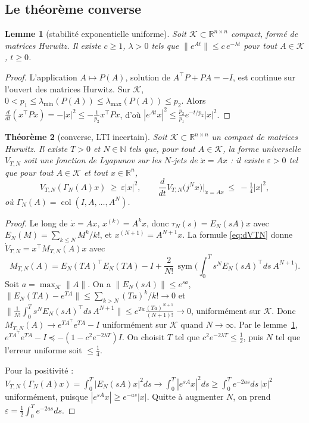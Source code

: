 \documentclass[11pt,a4paper]{article}
\newtheorem{theorem}{Théorème}[section]
\newtheorem{lemma}[theorem]{Lemme}
\theoremstyle{definition}
\theoremstyle{remark}
\newcommand{\R}{\mathbb{R}}
\newcommand{\N}{\mathbb{N}}
\newcommand{\jet}[2]{j^{#1}#2}
\newcommand{\tr}{^{\top}}
\newcommand{\sym}{\operatorname{sym}}
\newcommand{\col}{\operatorname{col}}
\begin{document}
\subsection{Le théorème converse}
\begin{lemma}[stabilité exponentielle uniforme]\label{lem:unif}
Soit $\mathcal K\subset\R^{n\times n}$ compact, formé de matrices Hurwitz. Il existe $c\ge1$, $\lambda>0$ tels que $\|e^{At}\|\le c\,e^{-\lambda t}$ pour tout $A\in\mathcal K$, $t\ge 0$.
\end{lemma}
\begin{proof}
L'application $A\mapsto P(A)$, solution de $A\tr P + PA = -I$, est continue sur l'ouvert des matrices Hurwitz. Sur $\mathcal K$, $0<p_1\le \lambda_{\min}(P(A))\le\lambda_{\max}(P(A))\le p_2$. Alors $\frac{d}{dt}(x\tr P x) = -|x|^2\le -\frac{1}{p_2}x\tr Px$, d'où $|e^{At}x|^2\le \frac{p_2}{p_1}e^{-t/p_2}|x|^2$.
\end{proof}

\begin{theorem}[converse, LTI incertain]\label{thm:LTI}
Soit $\mathcal K\subset\R^{n\times n}$ un compact de matrices Hurwitz. Il existe $T>0$ et $N\in\N$ tels que, pour tout $A\in\mathcal K$, la forme universelle $V_{T,N}$ soit une fonction de Lyapunov sur les $N$-jets de $\dot x = Ax$ : il existe $\varepsilon>0$ tel que pour tout $A\in\mathcal K$ et tout $x\in\R^n$,
\[
V_{T,N}(\Gamma_N(A)x)\ \ge\ \varepsilon|x|^2,\qquad
\frac{d}{dt}V_{T,N}\big(\jet{N}{x}\big)\Big|_{\dot x = Ax}\ \le\ -\tfrac14|x|^2,
\]
où $\Gamma_N(A) = \col(I,A,\dots,A^N)$.
\end{theorem}
\begin{proof}
Le long de $\dot x = Ax$, $x^{(k)} = A^kx$, donc $\tau_N(s) = E_N(sA)x$ avec $E_N(M) = \sum_{k\le N}M^k/k!$, et $x^{(N+1)} = A^{N+1}x$. La formule \eqref{eq:dVTN} donne $\dot V_{T,N} = x\tr M_{T,N}(A)x$ avec
\[
M_{T,N}(A) = E_N(TA)\tr E_N(TA) - I + \frac{2}{N!}\,\sym\Big(\int_0^T s^N E_N(sA)\tr ds\ A^{N+1}\Big).
\]
Soit $a = \max_{\mathcal K}\|A\|$. On a $\|E_N(sA)\|\le e^{sa}$, $\|E_N(TA) - e^{TA}\|\le \sum_{k>N}(Ta)^k/k!\to 0$ et $\big\|\frac{1}{N!}\int_0^Ts^NE_N(sA)\tr ds\,A^{N+1}\big\|\le e^{Ta}\frac{(Ta)^{N+1}}{(N+1)!}\to0$, uniformément sur $\mathcal K$. Donc $M_{T,N}(A)\to e^{TA\tr}e^{TA}-I$ uniformément sur $\mathcal K$ quand $N\to\infty$. Par le lemme~\ref{lem:unif}, $e^{TA\tr}e^{TA}-I\preceq -(1-c^2e^{-2\lambda T})I$. On choisit $T$ tel que $c^2e^{-2\lambda T}\le\frac12$, puis $N$ tel que l'erreur uniforme soit $\le\frac14$.

Pour la positivité : $V_{T,N}(\Gamma_N(A)x) = \int_0^T|E_N(sA)x|^2ds\to\int_0^T|e^{sA}x|^2ds\ge\int_0^Te^{-2as}ds\,|x|^2$ uniformément, puisque $|e^{sA}x|\ge e^{-as}|x|$. Quitte à augmenter $N$, on prend $\varepsilon = \frac12\int_0^Te^{-2as}ds$.
\end{proof}
\end{document}
